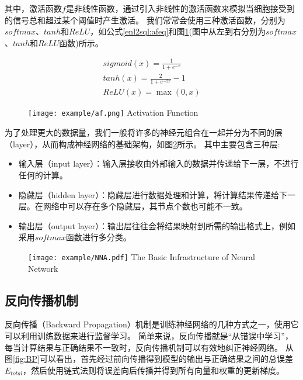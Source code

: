 其中，激活函数$f$是非线性函数，通过引入非线性的激活函数来模拟当细胞接受到的信号总和超过某个阈值时产生激活。
我们常常会使用三种激活函数，分别为$softmax$、$tanh$和$ReLU$，如公式\ref{enl2sql:afeq}和图\ref{fig:af}(图中从左到右分别为$softmax$、$tanh$和$ReLU$函数)所示。

\begin{gather}
  \label{enl2sql:afeq}
  sigmoid(x) = \frac{1}{1 + e^{-x}}\\
  tanh(x) = \frac{2}{1 + e^{-2x}} - 1\\
  ReLU(x) = \max(0,x)
\end{gather}

\begin{figure}[!htp]
  \centering
  \texttt{[image: example/af.png]}
    {Activation Function}
  \label{fig:af}
\end{figure}

为了处理更大的数据量，我们一般将许多的神经元组合在一起并分为不同的层（layer），从而构成神经网络的基础架构，如图\ref{fig:NNA}所示。
其中主要包含三种层:

\begin{itemize}
  \item 输入层（input layer）：输入层接收由外部输入的数据并传递给下一层，不进行任何的计算。
  \item 隐藏层（hidden layer）：隐藏层进行数据处理和计算，将计算结果传递给下一层。在网络中可以存在多个隐藏层，其节点个数也可能不一致。
  \item 输出层（output layer）：输出层往往会将结果映射到所需的输出格式上，例如采用$softmax$函数进行多分类。
\end{itemize}

\begin{figure}[!htp]
  \centering
  \texttt{[image: example/NNA.pdf]}
    {The Basic Infrastructure of Neural Network}
  \label{fig:NNA}
\end{figure}

\subsection{反向传播机制}

反向传播（Backward Propagation）机制\cite{rumelhart1986learning}是训练神经网络的几种方式之一，使用它可以利用训练数据来进行监督学习。
简单来说，反向传播就是“从错误中学习”，每当计算结果与正确结果不一致时，反向传播机制可以有效地纠正神经网络。
从图\ref{fig:BP}可以看出，首先经过前向传播得到模型的输出与正确结果之间的总误差$E_{total}$，然后使用链式法则将误差向后传播并得到所有向量和权重的更新梯度。

